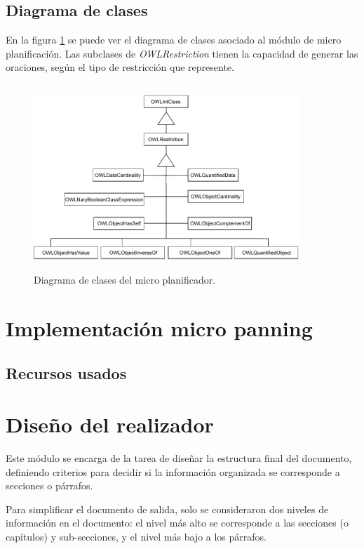\subsection{Diagrama de clases}
En la figura \ref{fig:diagrama_clases_microplanificador} se puede ver el diagrama de clases asociado al módulo de micro planificación. Las subclases de \emph{OWLRestriction} tienen la capacidad de generar las oraciones, según el tipo de restricción que represente.

\begin{figure}[H]
    \centering
    \includegraphics[width=10cm, height=7cm]{img/generacion_documento/diagrama_clases_microplanificador.pdf}
    \caption{Diagrama de clases del micro planificador.}
    \label{fig:diagrama_clases_microplanificador}
\end{figure}


\section{Implementación micro panning}

\subsection{Recursos usados}

\section{Diseño del realizador}
Este módulo se encarga de la tarea de diseñar la estructura final del documento, definiendo criterios para decidir si la información organizada se corresponde a secciones o párrafos.

Para simplificar el documento de salida, solo se consideraron dos niveles de información en el documento: el nivel más alto se corresponde a las secciones (o capítulos) y sub-secciones, y el nivel más bajo a los párrafos. 

